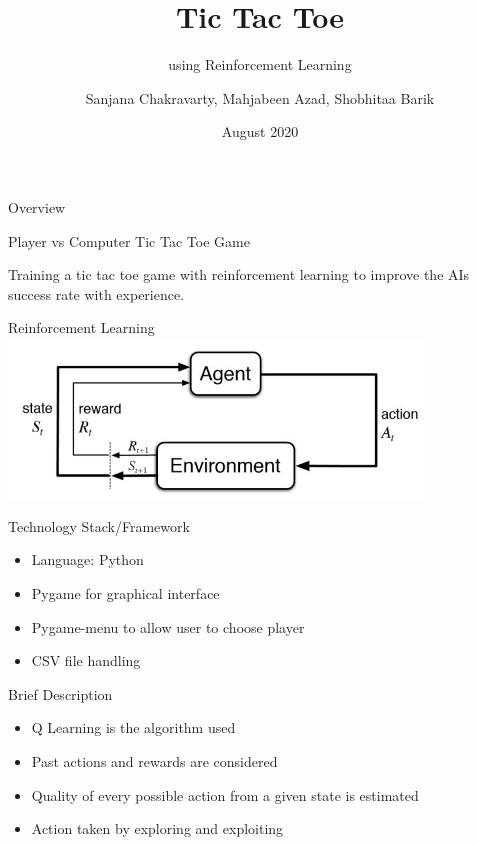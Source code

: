 \documentclass[14pt]{beamer}
\title[WTEF 2020]{Tic Tac Toe}
\subtitle{using Reinforcement Learning}
\author[Group 12]{Sanjana Chakravarty, Mahjabeen Azad, Shobhitaa Barik}
\date{August 2020}
\begin{document}
\begin{frame}
    \titlepage
\end{frame}

\begin{frame}{Overview}
    \begin{center}
        \textcolor{myAmber}{Player vs Computer Tic Tac Toe Game}
    \end{center}
   
    \begin{center}
    Training a tic tac toe game with reinforcement learning to improve the AI\textquotesingle s success rate with experience.
    \end{center}
\end{frame}

\begin{frame}{Reinforcement Learning}
    \includegraphics[width=110mm]{RL.jpg}
\end{frame}

\begin{frame}{Technology Stack/Framework}
        \begin{itemize}
            \item Language: Python
            \item Pygame for graphical interface 
            \item Pygame-menu to allow user to choose player
            \item CSV file handling
        \end{itemize}
\end{frame}

\begin{frame}{Brief Description}
        \begin{itemize}
            \item Q Learning is the algorithm used
            \item Past actions and rewards are considered
            \item Quality of every possible action from a given state is estimated
            \item Action taken by exploring and exploiting
        \end{itemize}
\end{frame}
\end{document}

